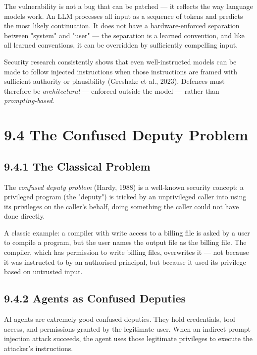 \documentclass[11pt,a4paper]{book}
\begin{document}
The vulnerability is not a bug that can be patched --- it reflects the way language models work. An LLM processes all input as a sequence of tokens and predicts the most likely continuation. It does not have a hardware-enforced separation between "system" and "user" --- the separation is a learned convention, and like all learned conventions, it can be overridden by sufficiently compelling input.

Security research consistently shows that even well-instructed models can be made to follow injected instructions when those instructions are framed with sufficient authority or plausibility (Greshake et al., 2023). Defences must therefore be \textit{architectural} --- enforced outside the model --- rather than \textit{prompting-based}.

\medskip

\section{9.4 The Confused Deputy Problem}

\subsection{9.4.1 The Classical Problem}

The \textit{confused deputy problem} (Hardy, 1988) is a well-known security concept: a privileged program (the "deputy") is tricked by an unprivileged caller into using its privileges on the caller's behalf, doing something the caller could not have done directly.

A classic example: a compiler with write access to a billing file is asked by a user to compile a program, but the user names the output file as the billing file. The compiler, which has permission to write billing files, overwrites it --- not because it was instructed to by an authorised principal, but because it used its privilege based on untrusted input.

\subsection{9.4.2 Agents as Confused Deputies}

AI agents are extremely good confused deputies. They hold credentials, tool access, and permissions granted by the legitimate user. When an indirect prompt injection attack succeeds, the agent uses those legitimate privileges to execute the attacker's instructions.
\end{document}
